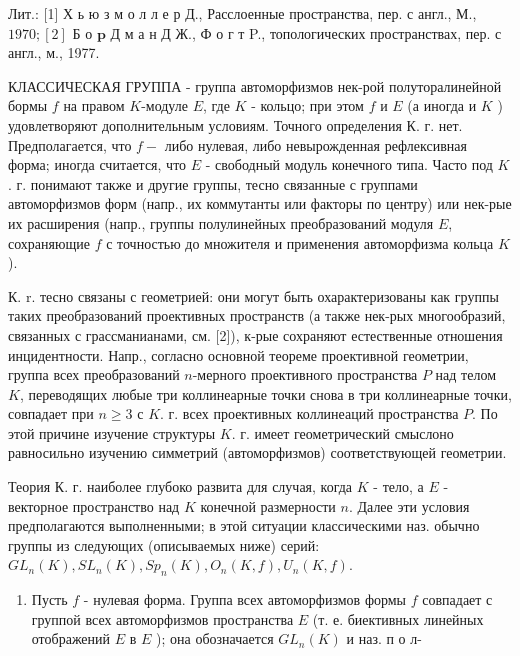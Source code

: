 \documentclass[10pt]{article}
\begin{document}
Лит.: [1] Х ь ю з м о л л е р Д., Расслоенные пространства, пер. с англ., М., $1970 ;[2]$ Б о $\mathbf{p}$ Д м а н Д Ж., Ф о г т P., топологических пространствах, пер. с англ., м., 1977.



КЛАССИЧЕСКАЯ ГРУППА - группа автоморфизмов нек-рой полуторалинейной бормы $f$ на правом $K$-модуле $E$, где $K$ - кольцо; при этом $f$ и $E$ (а иногда и $K$ ) удовлетворяют дополнительным условиям. Точного определения К. г. нет. Предполагается, что $f-$ либо нулевая, либо невырожденная рефлексивная форма; иногда считается, что $E$ - свободный модуль конечного типа. Часто под $K$. г. понимают также и другие группы, тесно связанные с группами автоморфизмов форм (напр., их коммутанты или факторы по центру) или нек-рые их расширения (напр., группы полулинейных преобразований модуля $E$, сохраняющие $f$ с точностью до множителя и применения автоморфизма кольца $K$ ).



К. r. тесно связаны с геометрией: они могут быть охарактеризованы как группы таких преобразований проективных пространств (а также нек-рых многообразий, связанных с грассманианами, см. [2]), к-рые сохраняют естественные отношения инцидентности. Напр., согласно основной теореме проективной геометрии, группа всех преобразований $n$-мерного проективного пространства $P$ над телом $K$, переводящих любые три коллинеарные точки снова в три коллинеарные точки, совпадает при $n \geqslant 3$ с $K$. г. всех проективных коллинеаций пространства $P$. По этой причине изучение структуры $K$. г. имеет геометрический смыслоно равносильно изучению симметрий (автоморфизмов) соответствующей геометрии.



Теория К. г. наиболее глубоко развита для случая, когда $K$ - тело, а $E$ - векторное пространство над $K$ конечной размерности $n$. Далее эти условия предполагаются выполненными; в этой ситуации классическими наз. обычно группы из следующих (описываемых ниже) серий: $G L_{n}(K), S L_{n}(K), S p_{n}(K), O_{n}(K, f), U_{n}(K, f)$.



\begin{enumerate}

  \item Пусть $f$ - нулевая форма. Группа всех автоморфизмов формы $f$ совпадает с группой всех автоморфизмов пространства $E$ (т. е. биективных линейных отображений $E$ в $E$ ); она обозначается $G L_{n}(K)$ и наз. п о л-

\end{enumerate}
\end{document}
